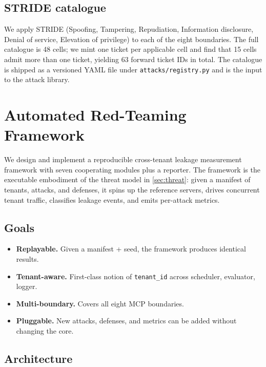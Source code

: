 \documentclass[sigconf, anonymous, natbib=false]{acmart}
\begin{document}
\subsection{STRIDE catalogue}

We apply STRIDE (Spoofing, Tampering, Repudiation,
Information disclosure, Denial of service, Elevation of
privilege) to each of the eight boundaries. The full
catalogue is 48 cells; we mint one ticket per applicable
cell and find that 15 cells admit more than one ticket,
yielding 63 forward ticket IDs in total. The catalogue is
shipped as a versioned YAML file under
\texttt{attacks/registry.py} and is the input to the attack
library.

\section{Automated Red-Teaming Framework}\label{sec:framework}

We design and implement a reproducible cross-tenant leakage
measurement framework with seven cooperating modules plus a
reporter. The framework is the executable embodiment of the
threat model in \cref{sec:threat}: given a manifest of
tenants, attacks, and defenses, it spins up the reference
servers, drives concurrent tenant traffic, classifies
leakage events, and emits per-attack metrics.

\subsection{Goals}

\begin{itemize}
  \item \textbf{Replayable.} Given a manifest + seed, the
        framework produces identical results.
  \item \textbf{Tenant-aware.} First-class notion of
        \texttt{tenant\_id} across scheduler, evaluator,
        logger.
  \item \textbf{Multi-boundary.} Covers all eight MCP
        boundaries.
  \item \textbf{Pluggable.} New attacks, defenses, and
        metrics can be added without changing the core.
\end{itemize}

\subsection{Architecture}
\end{document}
